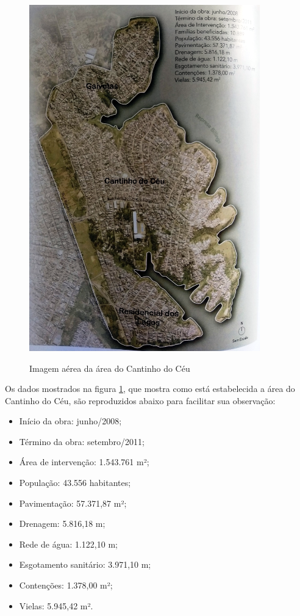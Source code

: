 	\begin{figure}[htb]
		\centering
		\caption{Imagem aérea da área do Cantinho do Céu}
		\includegraphics[height=15cm]{img/barda_peninsula}
		\label{fig:peninsula}
	\end{figure}
	
	Os dados mostrados na figura \ref{fig:peninsula}, que mostra como está estabelecida a área do Cantinho do Céu, são reproduzidos abaixo para facilitar sua observação:
	
	\begin{itemize}
	    \item Início da obra: junho/2008;
	    \item Término da obra: setembro/2011;
	    \item Área de intervenção: 1.543.761 m²;
	    \item População: 43.556 habitantes;
	    \item Pavimentação: 57.371,87 m²;
	    \item Drenagem: 5.816,18 m;
	    \item Rede de água: 1.122,10 m;
	    \item Esgotamento sanitário: 3.971,10 m;
	    \item Contenções: 1.378,00 m²;
	    \item Vielas: 5.945,42 m².
	\end{itemize}

